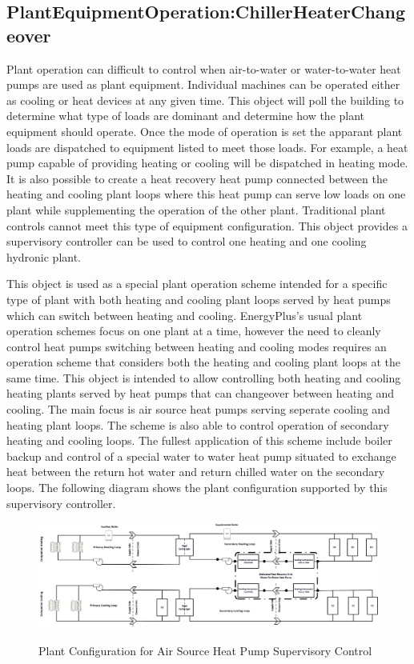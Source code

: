 \subsection{PlantEquipmentOperation:ChillerHeaterChangeover}\label{plantequipmentoperationchillerheaterchangeover}

Plant operation can difficult to control when air-to-water or water-to-water heat pumps are used as plant equipment.  Individual machines can be operated either as cooling or heat devices at any given time.  This object will poll the building to determine what type of loads are dominant and determine how the plant equipment should operate. Once the mode of operation is set the apparant plant loads are dispatched to equipment listed to meet those loads. For example, a heat pump capable of providing heating or cooling will be dispatched in heating mode. It is also possible to create a heat recovery heat pump connected between the heating and cooling plant loops where this heat pump can serve low loads on one plant while supplementing the operation of the other plant. Traditional plant controls cannot meet this type of equipment configuration. This object provides a supervisory controller can be used to control one heating and one cooling hydronic plant.

This object is used as a special plant operation scheme intended for a specific type of plant with both heating and cooling plant loops served by heat pumps which can switch between heating and cooling.  EnergyPlus's usual plant operation schemes focus on one plant at a time, however the need to cleanly control heat pumps switching between heating and cooling modes requires an operation scheme that considers both the heating and cooling plant loops at the same time.  This object is intended to allow controlling both heating and cooling heating plants served by heat pumps that can changeover between heating and cooling.  The main focus is air source heat pumps serving seperate cooling and heating plant loops.  The scheme is also able to control operation of secondary heating and cooling loops.  The fullest application of this scheme include boiler backup and control of a special water to water heat pump situated to exchange heat between the return hot water and return chilled water on the secondary loops. The following diagram shows the plant configuration supported by this supervisory controller. 

\begin{figure}[hbtp]
\centering
\includegraphics[width=1.0\textwidth, height=1.0\textheight, keepaspectratio=true]{media/ASHP_Plant.png}
\caption{Plant Configuration for Air Source Heat Pump Supervisory Control} \protect \label{fig:IO-ref-ASHP-Plant-Diag}
\end{figure}

